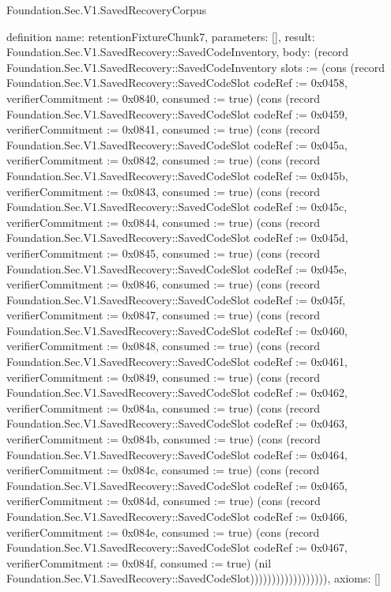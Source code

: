 \begin{lexlean}{Foundation.Sec.V1.SavedRecoveryCorpus}
\begin{semanticmodule}
definition{
  name: retentionFixtureChunk7,
  parameters: [],
  result: Foundation.Sec.V1.SavedRecovery::SavedCodeInventory,
  body: (record Foundation.Sec.V1.SavedRecovery::SavedCodeInventory {slots := (cons (record Foundation.Sec.V1.SavedRecovery::SavedCodeSlot {codeRef := 0x0458, verifierCommitment := 0x0840, consumed := true}) (cons (record Foundation.Sec.V1.SavedRecovery::SavedCodeSlot {codeRef := 0x0459, verifierCommitment := 0x0841, consumed := true}) (cons (record Foundation.Sec.V1.SavedRecovery::SavedCodeSlot {codeRef := 0x045a, verifierCommitment := 0x0842, consumed := true}) (cons (record Foundation.Sec.V1.SavedRecovery::SavedCodeSlot {codeRef := 0x045b, verifierCommitment := 0x0843, consumed := true}) (cons (record Foundation.Sec.V1.SavedRecovery::SavedCodeSlot {codeRef := 0x045c, verifierCommitment := 0x0844, consumed := true}) (cons (record Foundation.Sec.V1.SavedRecovery::SavedCodeSlot {codeRef := 0x045d, verifierCommitment := 0x0845, consumed := true}) (cons (record Foundation.Sec.V1.SavedRecovery::SavedCodeSlot {codeRef := 0x045e, verifierCommitment := 0x0846, consumed := true}) (cons (record Foundation.Sec.V1.SavedRecovery::SavedCodeSlot {codeRef := 0x045f, verifierCommitment := 0x0847, consumed := true}) (cons (record Foundation.Sec.V1.SavedRecovery::SavedCodeSlot {codeRef := 0x0460, verifierCommitment := 0x0848, consumed := true}) (cons (record Foundation.Sec.V1.SavedRecovery::SavedCodeSlot {codeRef := 0x0461, verifierCommitment := 0x0849, consumed := true}) (cons (record Foundation.Sec.V1.SavedRecovery::SavedCodeSlot {codeRef := 0x0462, verifierCommitment := 0x084a, consumed := true}) (cons (record Foundation.Sec.V1.SavedRecovery::SavedCodeSlot {codeRef := 0x0463, verifierCommitment := 0x084b, consumed := true}) (cons (record Foundation.Sec.V1.SavedRecovery::SavedCodeSlot {codeRef := 0x0464, verifierCommitment := 0x084c, consumed := true}) (cons (record Foundation.Sec.V1.SavedRecovery::SavedCodeSlot {codeRef := 0x0465, verifierCommitment := 0x084d, consumed := true}) (cons (record Foundation.Sec.V1.SavedRecovery::SavedCodeSlot {codeRef := 0x0466, verifierCommitment := 0x084e, consumed := true}) (cons (record Foundation.Sec.V1.SavedRecovery::SavedCodeSlot {codeRef := 0x0467, verifierCommitment := 0x084f, consumed := true}) (nil Foundation.Sec.V1.SavedRecovery::SavedCodeSlot)))))))))))))))))}),
  axioms: []
}


\end{semanticmodule}
\end{lexlean}
